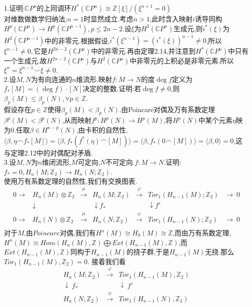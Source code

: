 \documentclass[b5paper]{ctexart}
\begin{document}
\pagestyle{plain}
\noindent
{}
1.证明:$\mathbb{C}P^n$的上同调环$H^*(\mathbb{C}P^n)\cong \mathbb{Z}[\xi]/(\xi ^{n+1}=0)$\\
对维数做数学归纳法,$n=1$时显然成立.考虑$n>1$,此时含入映射$i$诱导同构$H^p(\mathbb{C}P^n)\to H^p(\mathbb{C}P^{n-1}),p\leq 2n-2.$设$\xi$为$H^2(\mathbb{C}P^{n})$生成元,则$i^*(\xi)$为$H^2(\mathbb{C}P^{n-1})$中的非零元.根据假设,$i^*(\xi^{n-1})=(i^*(\xi))^{n-1}\neq 0$,所以$\xi^{n-1}\neq 0,$它是$H^{2n-2}(\mathbb{C}P^{n})$中的非零元.再由定理2.14,并注意到$H^*(\mathbb{C}P^n)$中只有一个生成元,故$H^{2n-2}(\mathbb{C}P^n)$与$H^{2}(\mathbb{C}P^n)$中非零元的上积必是非零元素.所以$\xi^n=\xi^{n-1}\smile \xi\neq 0.$\\
2.设$M,N$为有向连通的$n$维流形.映射$f:M\to N$的度$\deg f$定义为$f_*[M]=(\deg f)\cdot[N]$决定的整数.证明:若$\deg f\neq 0$,则$\beta_p(M)\leq\beta_p(N),\forall p\in\mathbb{Z}$.\\
假设存在$p\in\mathbb{Z}$使得$\beta_p(M)<\beta_p(N)$.由Poincare对偶及万有系数定理$\beta^p(M)<\beta^p(N)$,从而映射$f^p:H^p(N)\to H^p(M)$,将$H^p(N)$中某个元素$\eta$映为0.任取$\beta\in H^{n-p}(N)$,由卡积的自然性,$\langle \beta,\eta\frown f_*[M]\rangle=\langle \beta,f_*(f^*(\eta)\frown[M])\rangle=\langle \beta,f_*(0\frown[M])\rangle=\langle\beta,0\rangle=0$,这与定理2.12中的对偶配对矛盾.\\
3.设$M,N$为$n$维闭流形,$M$可定向,$N$不可定向.$f:M\rightarrow N$.证明:$f_*=0,H_n(M;\mathbb{Z}_2)\rightarrow H_n(N;\mathbb{Z}_2)$.\\
使用万有系数定理的自然性,我们有交换图表.\\
\[\begin{array}{ccccccc}
0  \rightarrow & H_n(M)\otimes \mathbb{Z}_2& \xrightarrow{\mu}& H_n(M;\mathbb{Z}_2)& \xrightarrow{\varphi} & Tor_1(H_{n-1}(M);\mathbb{Z}_2)&\rightarrow ~0\\
&\downarrow          &                  &\downarrow f_*&             &\downarrow  f'     \\
0  \rightarrow & H_n(N)\otimes \mathbb{Z}_2& \xrightarrow{\mu}& H_n(N;\mathbb{Z}_2)& \xrightarrow{\psi} & Tor_1(H_{n-1}(N);\mathbb{Z}_2)&\rightarrow ~0\\
\end{array}
\]
对于$M$,由$Poincare$对偶,我们有$H^n(M)\cong H_0(M)\cong \mathbb{Z}$,而由万有系数定理,$H^{n}(M)\cong Hom(H_n(M),\mathbb{Z})\bigoplus Ext(H_{n-1}(M),\mathbb{Z})$,而$Ext(H_{n-1}(M),\mathbb{Z})$同构于$H_{n-1}(M)$的挠子群,于是$H_{n-1}(M)$无挠.那么$Tor_1(H_{n-1}(M),\mathbb{Z}_2)=0$.
接着我们看
\[\begin{array}{ccc}
H_n(M;\mathbb{Z}_2)&\xrightarrow{\varphi} & Tor_1(H_{n-1}(M),\mathbb{Z}_2)\\
\downarrow~f_*& &\downarrow~f'\\
H_n(N;\mathbb{Z}_2)&\xrightarrow{\psi} & Tor_1(H_{n-1}(N),\mathbb{Z}_2)\\
\end{array}
\]
\end{document}
